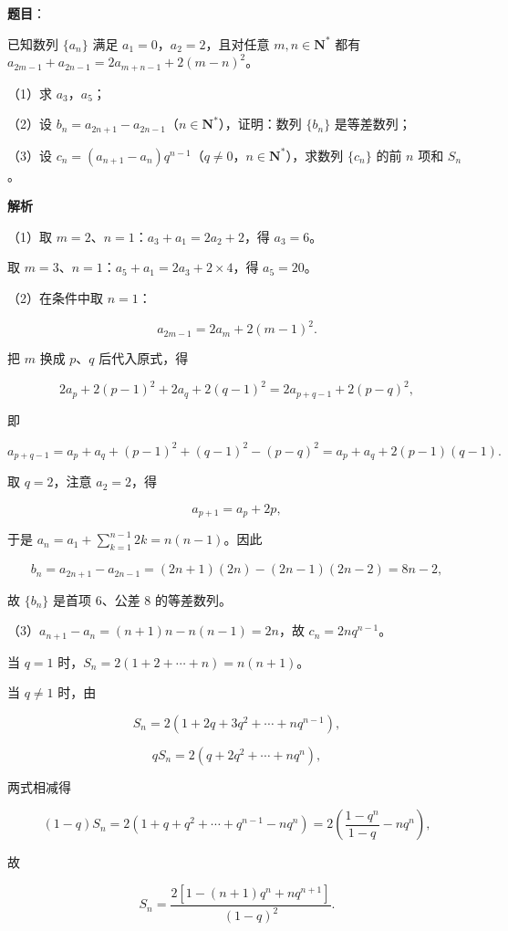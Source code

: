 \begin{answer}

\textbf{题目}：

已知数列 $\{a_n\}$ 满足 $a_1=0$，$a_2=2$，且对任意 $m,n\in\mathbf N^*$ 都有 $a_{2m-1}+a_{2n-1}=2a_{m+n-1}+2(m-n)^2$。

（1）求 $a_3$，$a_5$；

（2）设 $b_n=a_{2n+1}-a_{2n-1}$（$n\in\mathbf N^*$），证明：数列 $\{b_n\}$ 是等差数列；

（3）设 $c_n=(a_{n+1}-a_n)q^{n-1}$（$q\neq0$，$n\in\mathbf N^*$），求数列 $\{c_n\}$ 的前 $n$ 项和 $S_n$。

\textbf{解析}

（1）取 $m=2$、$n=1$：$a_3+a_1=2a_2+2$，得 $a_3=6$。

取 $m=3$、$n=1$：$a_5+a_1=2a_3+2\times4$，得 $a_5=20$。

（2）在条件中取 $n=1$：

\nopagebreak[4]
\[a_{2m-1}=2a_m+2(m-1)^2.\]

把 $m$ 换成 $p$、$q$ 后代入原式，得

\nopagebreak[4]
\[2a_p+2(p-1)^2+2a_q+2(q-1)^2=2a_{p+q-1}+2(p-q)^2,\]

即

\nopagebreak[4]
\[a_{p+q-1}=a_p+a_q+(p-1)^2+(q-1)^2-(p-q)^2=a_p+a_q+2(p-1)(q-1).\]

取 $q=2$，注意 $a_2=2$，得

\nopagebreak[4]
\[a_{p+1}=a_p+2p,\]

于是 $a_n=a_1+\sum\limits_{k=1}^{n-1}2k=n(n-1)$。因此

\nopagebreak[4]
\[b_n=a_{2n+1}-a_{2n-1}=(2n+1)(2n)-(2n-1)(2n-2)=8n-2,\]

故 $\{b_n\}$ 是首项 $6$、公差 $8$ 的等差数列。

（3）$a_{n+1}-a_n=(n+1)n-n(n-1)=2n$，故 $c_n=2nq^{n-1}$。

当 $q=1$ 时，$S_n=2\left(1+2+\cdots+n\right)=n(n+1)$。

当 $q\neq1$ 时，由

\nopagebreak[4]
\[S_n=2\left(1+2q+3q^2+\cdots+nq^{n-1}\right),\]

\nopagebreak[4]
\[qS_n=2\left(q+2q^2+\cdots+nq^n\right),\]

两式相减得

\nopagebreak[4]
\[\left(1-q\right)S_n=2\left(1+q+q^2+\cdots+q^{n-1}-nq^n\right)=2\left(\frac{1-q^n}{1-q}-nq^n\right),\]

故

\nopagebreak[4]
\[S_n=\frac{2\left[1-(n+1)q^n+nq^{n+1}\right]}{(1-q)^2}.\]


\end{answer}
